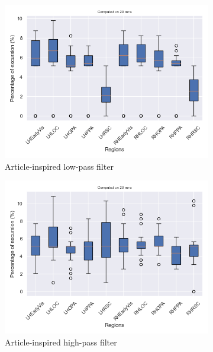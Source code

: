 \begin{figure}
    \centering
    \begin{subfigure}{0.45\textwidth}
        \centering
        \includegraphics[width=\textwidth]{img/low_non_continuous_filter_graph_randomization.png}
        \caption{Article-inspired low-pass filter}
    \end{subfigure}
    \hfill
    \begin{subfigure}{0.45\textwidth}
        \centering
        \includegraphics[width=\textwidth]{img/high_non_continuous_filter_graph_randomization.png}
        \caption{Article-inspired high-pass filter}
    \end{subfigure}
    \hfill
    \begin{subfigure}{0.45\textwidth}

\end{subfigure}
\end{figure}

